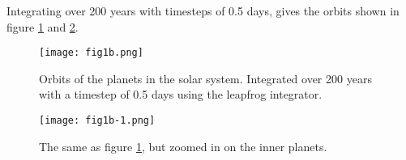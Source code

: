 Integrating over 200 years with timesteps of 0.5 days, gives the orbits shown in figure \ref{fig:orbits} and \ref{fig:orbits-zoom}.
\begin{figure}
    \centering
    \texttt{[image: fig1b.png]}
    \caption{Orbits of the planets in the solar system. Integrated over 200 years with a timestep of 0.5 days using the leapfrog integrator.}
    \label{fig:orbits}
\end{figure}
\begin{figure}
    \centering
    \texttt{[image: fig1b-1.png]}
    \caption{The same as figure \ref{fig:orbits}, but zoomed in on the inner planets.}
    \label{fig:orbits-zoom}
\end{figure}




